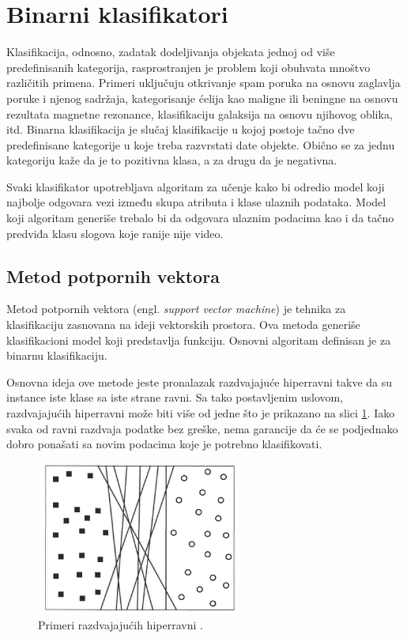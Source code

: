 \section{Binarni klasifikatori}

Klasifikacija, odnosno, zadatak dodeljivanja objekata jednoj od više predefinisanih kategorija, rasprostranjen je problem koji obuhvata mnoštvo različitih primena. Primeri uključuju otkrivanje spam poruka na osnovu zaglavlja poruke i njenog sadržaja, kategorisanje ćelija kao maligne ili beningne na osnovu rezultata magnetne rezonance, klasifikaciju galaksija na osnovu njihovog oblika, itd. Binarna klasifikacija je slučaj klasifikacije u kojoj postoje tačno dve predefinisane kategorije u koje treba razvrstati date objekte. Obično se za jednu kategoriju kaže da je to pozitivna klasa, a za drugu da je negativna.

Svaki klasifikator upotrebljava algoritam za učenje kako bi odredio model koji najbolje odgovara vezi između skupa atributa i klase ulaznih podataka. Model koji algoritam generiše trebalo bi da odgovara ulaznim podacima kao i da tačno predviđa klasu slogova koje ranije nije video. 


\subsection{Metod potpornih vektora} 

Metod potpornih vektora (engl. \textit{support vector machine}) je tehnika za klasifikaciju zasnovana na ideji vektorskih prostora. Ova metoda generiše klasifikacioni model koji predstavlja funkciju. Osnovni algoritam definisan je za binarnu klasifikaciju.

Osnovna ideja ove metode jeste pronalazak razdvajajuće hiperravni takve da su instance iste klase sa iste strane ravni. Sa tako postavljenim uslovom, razdvajajućih hiperravni može biti više od jedne što je prikazano na slici \ref{fig:svm1}. Iako svaka od ravni razdvaja podatke bez greške, nema garancije da će se podjednako dobro ponašati sa novim podacima koje je potrebno klasifikovati. 


\begin{figure}[H]
	\centering
	\includegraphics[width=0.6\textwidth]{Figures/svm1.png}
	\caption{Primeri razdvajajućih hiperravni \cite{introDM}.}
	\label{fig:svm1}
\end{figure}



